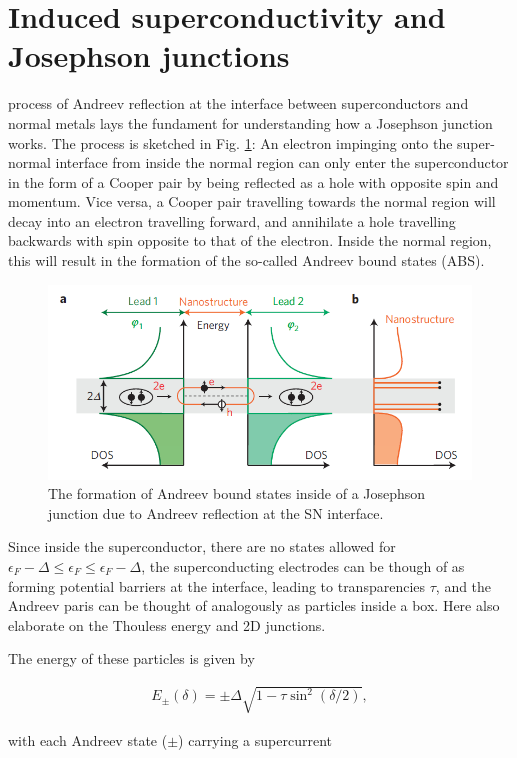 \section{Induced superconductivity and Josephson junctions}

 process of Andreev reflection at the interface between superconductors and normal metals lays the fundament for understanding how a Josephson junction works.
The process is sketched in Fig. \ref{fig:kdtmk}:
An electron impinging onto the super-normal interface from inside the normal region can only enter the superconductor in the form of a Cooper pair by being reflected as a hole with opposite spin and momentum.
Vice versa, a Cooper pair travelling towards the normal region will decay into an electron travelling forward, and annihilate a hole travelling backwards with spin opposite to that of the electron.
Inside the normal region, this will result in the formation of the so-called Andreev bound states (ABS).

\begin{figure}
	\centering
	\includegraphics[width=0.7\linewidth]{./chapter-theory/figs-JJ/KDTMK}
	\caption{The formation of Andreev bound states inside of a Josephson junction due to Andreev reflection at the SN interface.}
	\label{fig:kdtmk}
\end{figure}

Since inside the superconductor, there are no states allowed for $\epsilon_F - \Delta \leq \epsilon_F \leq \epsilon_F - \Delta$, the superconducting electrodes can be though of as forming potential barriers at the interface, leading to transparencies $\tau$, and the Andreev paris can be thought of analogously as particles inside a box.
Here also elaborate on the Thouless energy and 2D junctions.

The energy of these particles is given by

\begin{eqnarray}
E_{\pm}(\delta)=\pm\Delta\sqrt{1-\tau\sin^2(\delta/2)},
\end{eqnarray}

with each Andreev state ($\pm$) carrying a supercurrent

